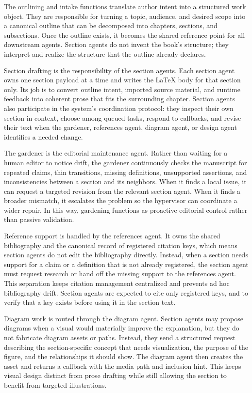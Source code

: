 \documentclass[11pt]{article}
\begin{document}
The outlining and intake functions translate author intent into a structured work object. They are responsible for turning a topic, audience, and desired scope into a canonical outline that can be decomposed into chapters, sections, and subsections. Once the outline exists, it becomes the shared reference point for all downstream agents. Section agents do not invent the book's structure; they interpret and realize the structure that the outline already declares.

Section drafting is the responsibility of the section agents. Each section agent owns one section payload at a time and writes the \LaTeX{} body for that section only. Its job is to convert outline intent, imported source material, and runtime feedback into coherent prose that fits the surrounding chapter. Section agents also participate in the system's coordination protocol: they inspect their own section in context, choose among queued tasks, respond to callbacks, and revise their text when the gardener, references agent, diagram agent, or design agent identifies a needed change.

The gardener is the editorial maintenance agent. Rather than waiting for a human editor to notice drift, the gardener continuously checks the manuscript for repeated claims, thin transitions, missing definitions, unsupported assertions, and inconsistencies between a section and its neighbors. When it finds a local issue, it can request a targeted revision from the relevant section agent. When it finds a broader mismatch, it escalates the problem so the hypervisor can coordinate a wider repair. In this way, gardening functions as proactive editorial control rather than passive validation.

Reference support is handled by the references agent. It owns the shared bibliography and the canonical record of registered citation keys, which means section agents do not edit the bibliography directly. Instead, when a section needs support for a claim or a definition that is not already registered, the section agent must request research or hand off the missing support to the references agent. This separation keeps citation management centralized and prevents ad hoc bibliography drift. Section agents are expected to cite only registered keys, and to verify that a key exists before using it in the section text.

Diagram work is routed through the diagram agent. Section agents may propose diagrams when a visual would materially improve the explanation, but they do not fabricate diagram assets or paths. Instead, they send a structured request describing the section-specific concept that needs visualization, the purpose of the figure, and the relationships it should show. The diagram agent then creates the asset and returns a callback with the media path and inclusion hint. This keeps visual design distinct from prose drafting while still allowing the section to benefit from targeted illustrations.
\end{document}
